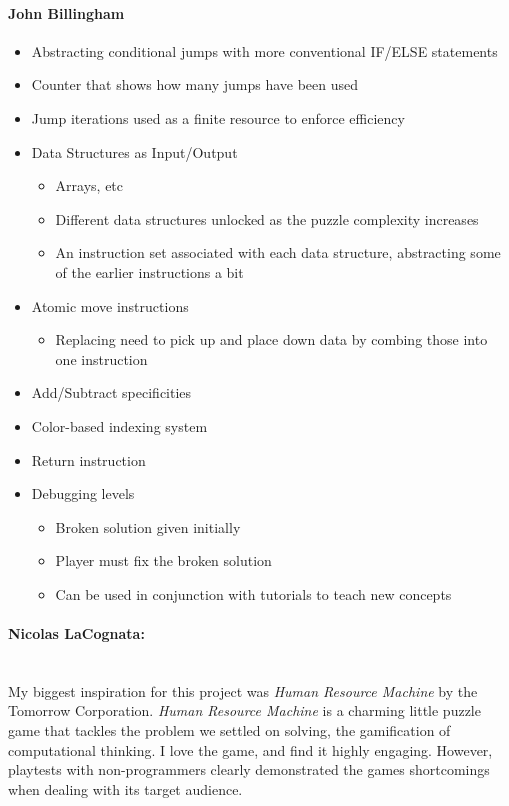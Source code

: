 \paragraph{John Billingham}
\begin{itemize}
  \item Abstracting conditional jumps with more conventional IF/ELSE statements
  \item Counter that shows how many jumps have been used
  \item Jump iterations used as a finite resource to enforce efficiency
  \item Data Structures as Input/Output
  \begin{itemize}
    \item Arrays, etc
    \item Different data structures unlocked as the puzzle complexity increases
    \item An instruction set associated with each data structure, abstracting
    some of the earlier instructions a bit
  \end{itemize}
  \item Atomic move instructions
  \begin{itemize}
    \item Replacing need to pick up and place down data by combing those into
    one instruction
  \end{itemize}
  \item Add/Subtract specificities
  \item Color-based indexing system
  \item Return instruction
  \item Debugging levels
  \begin{itemize}
    \item Broken solution given initially
    \item Player must fix the broken solution
    \item Can be used in conjunction with tutorials to teach new concepts
  \end{itemize}
\end{itemize}

\paragraph{Nicolas LaCognata:}\mbox{} \\
My biggest inspiration for this project was \textit{Human Resource Machine} by the Tomorrow Corporation. 
\textit{Human Resource Machine} is a charming little puzzle game that tackles the problem we settled on solving, 
the gamification of computational thinking. I love the game, and find it highly engaging. However, playtests
with non-programmers clearly demonstrated the games shortcomings when dealing with its target audience. 

